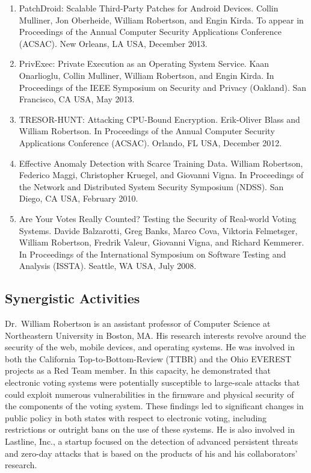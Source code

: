 \documentclass[letterpaper,twoside,11pt,headings=small]{scrartcl}
\begin{document}
\begin{enumerate}
    \item PatchDroid: Scalable Third-Party Patches for Android Devices.
    Collin Mulliner, Jon Oberheide, William Robertson, and Engin Kirda.
    To appear in Proceedings of the Annual Computer Security Applications Conference (ACSAC).
    New Orleans, LA USA, December 2013.
    \item PrivExec: Private Execution as an Operating System Service.
    Kaan Onarlioglu, Collin Mulliner, William Robertson, and Engin Kirda.
    In Proceedings of the IEEE Symposium on Security and Privacy (Oakland).
    San Francisco, CA USA, May 2013.
    \item TRESOR-HUNT: Attacking CPU-Bound Encryption.
    Erik-Oliver Blass and William Robertson.
    In Proceedings of the Annual Computer Security Applications Conference (ACSAC).
    Orlando, FL USA, December 2012.
    \item Effective Anomaly Detection with Scarce Training Data.
    William Robertson, Federico Maggi, Christopher Kruegel, and Giovanni Vigna.
    In Proceedings of the Network and Distributed System Security Symposium (NDSS).
    San Diego, CA USA, February 2010.
    \item Are Your Votes Really Counted? Testing the Security of Real-world Voting Systems.
    Davide Balzarotti, Greg Banks, Marco Cova, Viktoria Felmetsger, William Robertson, Fredrik Valeur, Giovanni Vigna, and Richard Kemmerer.
    In Proceedings of the International Symposium on Software Testing and Analysis (ISSTA).
    Seattle, WA USA, July 2008.
\end{enumerate}

\subsection*{Synergistic Activities}

Dr.~William Robertson is an assistant professor of Computer Science at
Northeastern University in Boston, MA.  His research interests revolve around
the security of the web, mobile devices, and operating systems. He was
involved in both the California Top-to-Bottom-Review (TTBR) and the Ohio
EVEREST projects as a Red Team member.  In this capacity, he demonstrated that
electronic voting systems were potentially susceptible to large-scale attacks
that could exploit numerous vulnerabilities in the firmware and physical
security of the components of the voting system.  These findings led to
significant changes in public policy in both states with respect to electronic
voting, including restrictions or outright bans on the use of these systems.
He is also involved in Lastline, Inc., a startup focused on the detection of
advanced persistent threats and zero-day attacks that is based on the products
of his and his collaborators' research.
\end{document}
